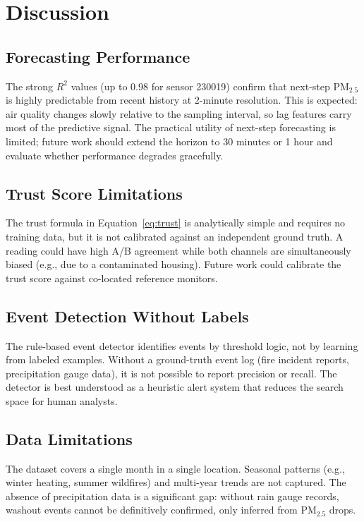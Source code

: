 \documentclass[11pt, letterpaper]{article}
\begin{document}
\section{Discussion}

\subsection{Forecasting Performance}

The strong $R^2$ values (up to 0.98 for sensor 230019) confirm that next-step
PM$_{2.5}$ is highly predictable from recent history at 2-minute resolution.
This is expected: air quality changes slowly relative to the sampling interval,
so lag features carry most of the predictive signal.
The practical utility of next-step forecasting is limited; future work should
extend the horizon to 30 minutes or 1 hour and evaluate whether performance
degrades gracefully.

\subsection{Trust Score Limitations}

The trust formula in Equation~\ref{eq:trust} is analytically simple and requires
no training data, but it is not calibrated against an independent ground truth.
A reading could have high A/B agreement while both channels are simultaneously
biased (e.g., due to a contaminated housing).
Future work could calibrate the trust score against co-located reference monitors.

\subsection{Event Detection Without Labels}

The rule-based event detector identifies events by threshold logic, not by
learning from labeled examples.
Without a ground-truth event log (fire incident reports, precipitation gauge data),
it is not possible to report precision or recall.
The detector is best understood as a heuristic alert system that reduces the
search space for human analysts.

\subsection{Data Limitations}

The dataset covers a single month in a single location.
Seasonal patterns (e.g., winter heating, summer wildfires) and multi-year
trends are not captured.
The absence of precipitation data is a significant gap: without rain gauge
records, washout events cannot be definitively confirmed, only inferred from
PM$_{2.5}$ drops.
\end{document}
